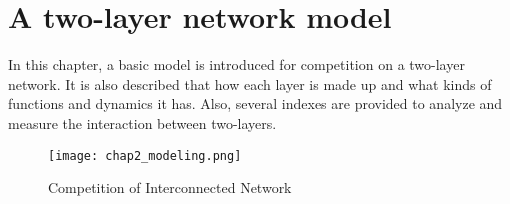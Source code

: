 
\chapter{A two-layer network model}
\label{chap2}
In this chapter, a basic model is introduced for competition on a two-layer network. It is also described that how each layer is made up and what kinds of functions and dynamics it has. Also, several indexes are provided to analyze and measure the interaction between two-layers.
\begin{figure}[!htb]
	\centering
	\texttt{[image: chap2\_modeling.png]}
	\caption{Competition of Interconnected Network}
	\label{chap2_modeling}
\end{figure}
 
